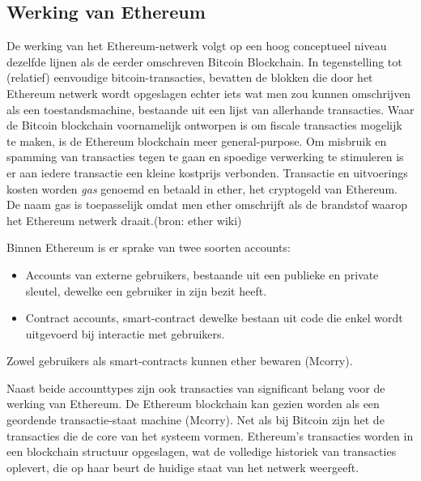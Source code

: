 	\subsection{Werking van Ethereum}
		De werking van het Ethereum-netwerk volgt op een hoog conceptueel niveau dezelfde lijnen als de eerder omschreven Bitcoin Blockchain. In tegenstelling tot (relatief) eenvoudige bitcoin-transacties, bevatten de blokken die door het Ethereum netwerk wordt opgeslagen echter iets wat men zou kunnen omschrijven als een toestandsmachine, bestaande uit een lijst van allerhande transacties. Waar de Bitcoin blockchain voornamelijk ontworpen is om fiscale transacties mogelijk te maken, is de Ethereum blockchain meer general-purpose. Om misbruik en spamming van transacties tegen te gaan en spoedige verwerking te stimuleren is er aan iedere transactie een kleine kostprijs verbonden. Transactie en uitvoerings kosten worden \textit{gas} genoemd en betaald in ether, het cryptogeld van Ethereum. De naam gas is toepasselijk omdat men ether omschrijft als de brandstof waarop het Ethereum netwerk draait.(bron: ether wiki)
		
		Binnen Ethereum is er sprake van twee soorten accounts: 
		\begin{itemize}
			\item Accounts van externe gebruikers, bestaande uit een publieke en private sleutel, dewelke een gebruiker in zijn bezit heeft.
			\item Contract accounts, smart-contract dewelke bestaan uit code die enkel wordt uitgevoerd bij interactie met gebruikers.
		\end{itemize}	
		Zowel gebruikers als smart-contracts kunnen ether bewaren (Mcorry). 
		
		Naast beide accounttypes zijn ook transacties van significant belang voor de werking van Ethereum. De Ethereum blockchain kan gezien worden als een geordende transactie-staat machine (Mcorry). Net als bij Bitcoin zijn het  de transacties die  de core van het systeem vormen. Ethereum's transacties worden in een blockchain structuur opgeslagen, wat de volledige historiek van transacties oplevert, die  op haar beurt de huidige staat van het netwerk weergeeft.
		
